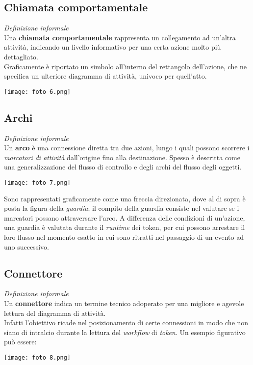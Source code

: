 \documentclass{article}
\begin{document}
\subsection*{Chiamata comportamentale}
\large
\textit{Definizione informale}\\Una \textbf{chiamata comportamentale} rappresenta un collegamento ad un'altra attività, indicando un livello informativo per una certa azione molto più dettagliato.\vspace*{14pt}\\
Graficamente è riportato un simbolo all'interno del rettangolo dell'azione, che ne specifica un ulteriore diagramma di attività, univoco per quell'atto.\\
\begin{center}
    \texttt{[image: foto 6.png]}
\end{center}

\subsection*{Archi}
\large
\textit{Definizione informale}\\Un \textbf{arco} è una connessione diretta tra due azioni, lungo i quali possono scorrere i \textit{marcatori di attività} dall'origine fino alla destinazione. Spesso è descritta come una generalizzazione del flusso di controllo e degli archi del flusso degli oggetti.\\
\begin{center}
    \texttt{[image: foto 7.png]}
\end{center}
Sono rappresentati graficamente come una freccia direzionata, dove al di sopra è posta la figura della \textit{guardia}; il compito della guardia consiste nel valutare se i marcatori possano attraversare l'arco. A differenza delle condizioni di un'azione, una guardia è valutata durante il \textit{runtime} dei token, per cui possono arrestare il loro flusso nel momento esatto in cui sono ritratti nel passaggio di un evento ad uno successivo.

\subsection*{Connettore}
\textit{Definizione informale}\\Un \textbf{connettore} indica un termine tecnico adoperato per una migliore e agevole lettura del diagramma di attività.\vspace*{14pt}\\
Infatti l'obiettivo ricade nel posizionamento di certe connessioni in modo che non siano di intralcio durante la lettura del \textit{workflow} di \textit{token}. Un esempio figurativo può essere:\\
\begin{center}
    \texttt{[image: foto 8.png]}
\end{center}
\end{document}
